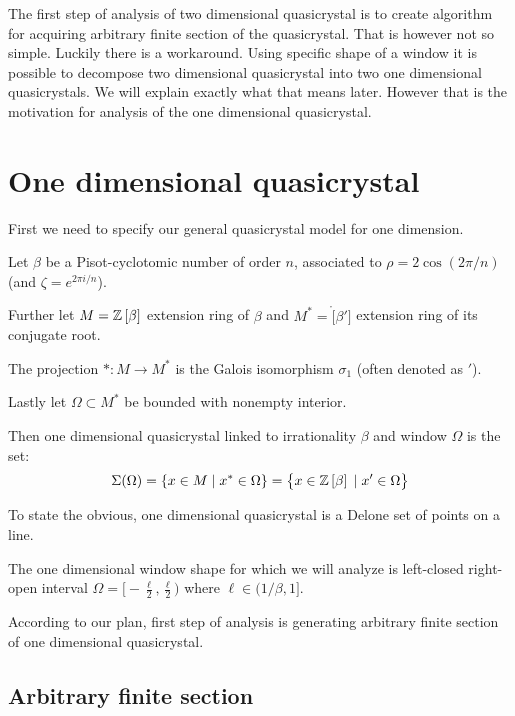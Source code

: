 \documentclass[text.tex]{subfiles}
\begin{document}
The first step of analysis of two dimensional quasicrystal is to create algorithm for acquiring arbitrary finite section of the quasicrystal. That is however not so simple. Luckily there is a workaround. Using specific shape of a window it is possible to decompose two dimensional quasicrystal into two one dimensional quasicrystals. We will explain exactly what that means later. However that is the motivation for analysis of the one dimensional quasicrystal. 

\section{One dimensional quasicrystal}
First we need to specify our general quasicrystal model for one dimension. 

Let $\beta$ be a Pisot-cyclotomic number of order $n$, associated to $\rho = 2\cos\left(2\pi/n\right)$ (and $\zeta = e^{2\pi i/n}$). 

Further let $M = \mathbb{Z}\left[\beta\right]$ extension ring of $\beta$ and $M^\ast = \ring[\beta']$ extension ring of its conjugate root.

The projection $\ast:M\rightarrow M^\ast$ is the Galois isomorphism $\sigma_1$ (often denoted as $'$). 

Lastly let $\Omega\subset M^\ast$ be bounded with nonempty interior. 

Then one dimensional quasicrystal linked to irrationality $\beta$ and window $\Omega$ is the set:
$$\Sigma(\Omega) = \{ x \in M\; |\; x^\ast\in \Omega\} = \big\{ x \in \mathbb{Z}\left[\beta\right]\; |\; x'\in \Omega\big\}$$

To state the obvious, one dimensional quasicrystal is a Delone set of points on a line. 

The one dimensional window shape for which we will analyze is left-closed right-open interval $\Omega = \big[-\frac{\ell}{2}, \frac{\ell}{2}\big)$ where $\ell\in (1/\beta,1]$. 



According to our plan, first step of analysis is generating arbitrary finite section of one dimensional quasicrystal. 

\subsection{Arbitrary finite section}
\end{document}

